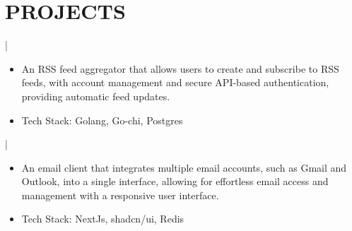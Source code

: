 \documentclass[]{resume}
\begin{document}
\section{PROJECTS}
 | \href{https://github.com/saswatax/rss-aggregator}{\faGithub}
\begin{itemize}
  \item An RSS feed aggregator that allows users to create and subscribe to RSS feeds, with account management and secure API-based authentication, providing automatic feed updates.
  \item Tech Stack: Golang, Go-chi, Postgres
\end{itemize}
 | \href{https://github.com/saswatax/email-client}{\faGithub}
\begin{itemize}
  \item An email client that integrates multiple email accounts, such as Gmail and Outlook, into a single interface, allowing for effortless email access and management with a responsive user interface.
  \item Tech Stack: NextJs, shadcn/ui, Redis
\end{itemize}
\end{document}
